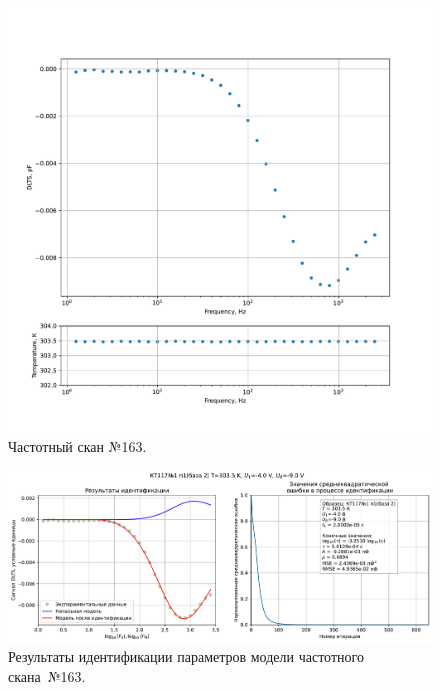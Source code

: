 \begin{figure}[!ht]
    \centering
    \includegraphics[width=1\textwidth]{../plots/КТ117№1_п1(база 2)_2500Гц-1Гц_1пФ_+30С_-4В-9В_200мВ_20мкс_шаг_0,1.pdf}
    \caption{Частотный скан №163.}
    \label{pic:frequency_scan_163}
\end{figure}

\begin{figure}[!ht]
    \centering
    \includegraphics[width=1\textwidth]{../plots/КТ117№1_п1(база 2)_2500Гц-1Гц_1пФ_+30С_-4В-9В_200мВ_20мкс_шаг_0,1_model.pdf}
    \caption{Результаты идентификации параметров модели частотного скана~№163.}
    \label{pic:frequency_scan_model163}
\end{figure}

\pagebreak


